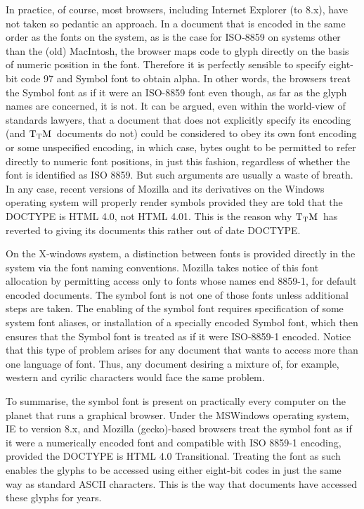 \documentclass[12pt]{article}
\def\TtM{$\rm{}T_TH$}
\def\TtM{$\rm{}T_TM$}%
\begin{document}
In practice, of course, most browsers, including Internet Explorer (to
8.x), have not taken so pedantic an approach. In a document that is
encoded in the same order as the fonts on the system, as is the case
for ISO-8859 on systems other than the (old) MacIntosh, the browser maps
code to glyph directly on the basis of numeric position in the
font. Therefore it is perfectly sensible to specify eight-bit code 97
and Symbol font to obtain alpha. In other words, the browsers treat
the Symbol font as if it were an ISO-8859 font even though, as far as
the glyph names are concerned, it is not. It can be argued, even
within the world-view of standards lawyers, that a document that does
not explicitly specify its encoding (and \TtM\ documents do not) could
be considered to obey its own font encoding or some unspecified
encoding, in which case, bytes ought to be permitted to refer directly
to numeric font positions, in just this fashion, regardless of whether
the font is identified as ISO 8859. But such arguments are usually a
waste of breath. In any case, recent versions of Mozilla and its
derivatives on the Windows operating system will properly render
symbols provided they are told that the DOCTYPE is HTML 4.0, not HTML
4.01. This is the reason why \TtM\ has reverted to giving its
documents this rather out of date DOCTYPE.

On the X-windows system, a distinction between fonts is provided
directly in the system via the font naming conventions. Mozilla takes
notice of this font allocation by permitting access only to fonts
whose names end 8859-1, for default encoded documents. The symbol font
is not one of those fonts unless additional steps are taken. The
enabling of the symbol font requires specification of some system font
aliases, or installation of a specially encoded Symbol font, which
then ensures that the Symbol font is treated as if it were ISO-8859-1
encoded. Notice that this type of problem arises for any document that
wants to access more than one language of font. Thus, any document
desiring a mixture of, for example, western and cyrilic characters
would face the same problem.

To summarise, the symbol font is present on practically every computer
on the planet that runs a graphical browser. Under the MSWindows
operating system, IE to version 8.x, and Mozilla (gecko)-based
browsers treat the symbol font as if it were a numerically encoded
font and compatible with ISO 8859-1 encoding, provided the DOCTYPE is
HTML 4.0 Transitional.  Treating the font as such enables the glyphs to be
accessed using either eight-bit codes in just the same way as standard
ASCII characters. This is the way that documents have accessed these
glyphs for years.
\end{document}
